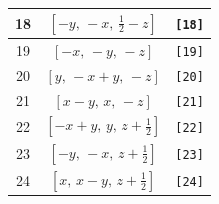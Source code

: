 \documentclass[fleqn,8pt]{jsarticle}
\begin{document}
\begin{longtable}{ccc}
18 & $\left[ - y,\, - x,\, \frac{1}{2} - z \right]$ & {\tt [18]} \\ \hline
19 & $\left[ - x,\, - y,\, - z \right]$ & {\tt [19]} \\ \hline
20 & $\left[ y,\, - x + y,\, - z \right]$ & {\tt [20]} \\ \hline
21 & $\left[ x - y,\, x,\, - z \right]$ & {\tt [21]} \\ \hline
22 & $\left[ - x + y,\, y,\, z + \frac{1}{2} \right]$ & {\tt [22]} \\ \hline
23 & $\left[ - y,\, - x,\, z + \frac{1}{2} \right]$ & {\tt [23]} \\ \hline
24 & $\left[ x,\, x - y,\, z + \frac{1}{2} \right]$ & {\tt [24]} \\
\end{longtable}
\end{document}
